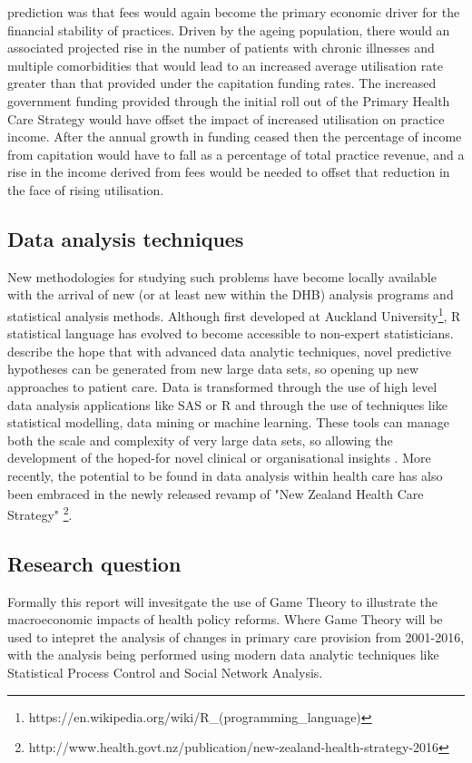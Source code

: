 \documentclass[11pt,a4paper]{article}
\begin{document}
\citet{howell2005restructuring} prediction was that fees would again become the primary economic driver for the financial stability of practices. Driven by the ageing population, there would an associated projected rise in the number of patients with chronic illnesses and multiple comorbidities that would lead to an increased  average utilisation rate greater than that provided under the capitation funding rates. The increased government funding provided through the initial roll out of the Primary Health Care Strategy would have offset the impact of increased utilisation on practice income. After the annual growth in funding ceased then the percentage of income from capitation would have to fall as a percentage of total practice revenue, and a rise in the income derived from fees  would be needed to offset that reduction in the face of rising utilisation.\\


\subsection{Data analysis techniques}
New methodologies for studying such problems have become locally available with the arrival of new (or at least new within the DHB) analysis programs and statistical analysis methods. Although first developed at Auckland University\footnote{https://en.wikipedia.org/wiki/R\_(programming\_language)}, R statistical language has evolved to become accessible to non-expert statisticians. \citet{khoury2014big} describe the hope that with advanced data analytic techniques,  novel predictive hypotheses can be generated from new large data sets, so opening up new approaches to patient care. Data is transformed through the use of high level data analysis applications like SAS or R and through the use of techniques like statistical modelling, data mining or machine learning. These tools can manage both the scale and complexity of very large data sets, so allowing the development of the  hoped-for novel clinical or organisational insights \citep{reshef2011detecting}.  More recently, the potential to be found in data analysis within health care has also been embraced in the newly released revamp of "New Zealand Health Care Strategy" \footnote{http://www.health.govt.nz/publication/new-zealand-health-strategy-2016}. \\


\subsection{Research question}
Formally this report will invesitgate the use of Game Theory to illustrate the macroeconomic impacts of health policy reforms. Where Game Theory will be used to intepret the analysis of changes in primary care provision from 2001-2016, with the analysis being performed using modern data analytic techniques like Statistical Process Control and Social Network Analysis.\\
\end{document}
